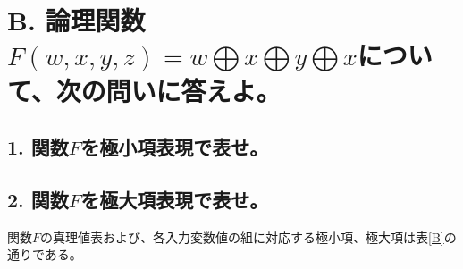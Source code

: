 \documentclass[10pt,dvipdfmx]{jsarticle}
\begin{document}
\section*{B. 論理関数$F(w, x, y, z)= w \bigoplus x \bigoplus y \bigoplus x$について、次の問いに答えよ。}

\subsection*{1. 関数$F$を極小項表現で表せ。}
\subsection*{2. 関数$F$を極大項表現で表せ。}

関数$F$の真理値表および、各入力変数値の組に対応する極小項、極大項は表\ref{B}の通りである。
\end{document}
